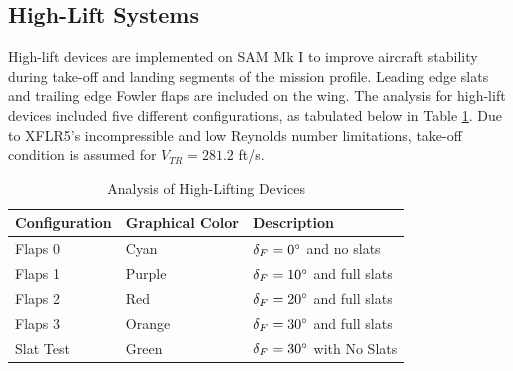 \subsection{High-Lift Systems}\label{sec:highlift}
High-lift devices are implemented on SAM Mk I to improve aircraft stability during take-off and landing segments of the mission profile.  Leading edge slats and trailing edge Fowler flaps are included on the wing.  The analysis for high-lift devices included five different configurations, as tabulated below in Table \ref{tab:highlyfttest}.  Due to XFLR5's incompressible and low Reynolds number limitations, take-off condition is assumed for $V_{TR} = 281.2$ ft/s.

\begin{table}[!h]
    \centering
    \caption{Analysis of High-Lifting Devices}
    \begin{tabular}{|p{1in}|p{1in}|p{}|}\toprule
        \textbf{Configuration} & \textbf{Graphical Color} & \textbf{Description}\\\hline \hline
        Flaps 0 & Cyan & $\delta_F=0\degree$ and no slats \\ \hline
        Flaps 1 & Purple & $\delta_F = 10\degree$ and full slats \\ \hline
        Flaps 2 & Red & $\delta_F = 20\degree$ and full slats \\\hline
        Flaps 3 & Orange & $\delta_F = 30\degree$ and full slats \\\hline
        Slat Test & Green & $\delta_F = 30\degree$ with No Slats \\ \bottomrule
    \end{tabular}
    \label{tab:highlyfttest}
\end{table}

